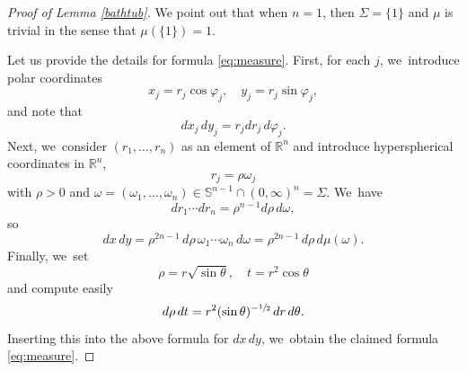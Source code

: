 \documentclass[11pt]{article}
\let\oldsfrac\sfrac
\renewcommand{\sfrac}[2]{{\oldsfrac{#1}{#2}}}
\theoremstyle{definition}
\let\phi\varphi
\newcommand{\1}{\mathbbm{1}}
\newcommand{\R}{\mathbb{R}}
\newcommand{\Sph}{\mathbb{S}}
\numberwithin{equation}{section}
\begin{document}
\begin{proof}[Proof of Lemma \ref{bathtub}]
We point out that when $n=1$, then $\Sigma=\{1\}$ and $\mu$ is trivial in the sense that $\mu(\{1\})=1$.

Let us provide the details for formula \eqref{eq:measure}. First, for each $j$, we~introduce polar coordinates
\[
x_j = r_j \cos\phi_j,
\quad
y_j = r_j \sin\phi_j,
\]
and note that
\[
dx_j\,dy_j = r_j dr_j \,d\phi_j.
\]
Next, we~consider $(r_1,\ldots,r_n)$ as an element of $\R^n$ and introduce hyperspherical coordinates in $\R^n$,
\[
r_j = \rho \omega_j
\]
with $\rho>0$ and $\omega=(\omega_1,\ldots,\omega_n)\in\Sph^{n-1}\cap(0,\infty)^n=\Sigma$. We~have
\[
dr_1\cdots dr_n = \rho^{n-1}d\rho\,d\omega,
\]
so
\[
dx\,dy = \rho^{2n-1} \,d\rho\,\omega_1\cdots\omega_n \,d\omega = \rho^{2n-1}\,d\rho\,d\mu(\omega).
\]
Finally, we~set
\[
\rho = r \sqrt{\sin\theta},
\quad
t= r^2 \cos\theta
\]
and compute easily
\[
d\rho\,dt = r^2 (\sin\theta)^{-\sfrac12}\,dr\,d\theta.
\]
Inserting this into the above formula for $dx\,dy$, we~obtain the claimed formula \eqref{eq:measure}.


\end{proof}
\end{document}
